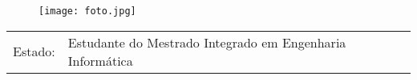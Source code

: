 \documentclass[10pt,a4paper]{article}
\newcommand{\tzlarrow}{(0,0) -- (0.2,0) -- (0.3,0.2) -- (0.2,0.4) -- (0,0.4) -- (0.1,0.2) -- cycle;}
\newcommand{\larrow}[1]
{\begin{tikzpicture}[scale=0.58]
	 \filldraw[fill=#1!100,draw=#1!100!black]  \tzlarrow
 \end{tikzpicture}
}
\newcommand{\metasection}[2]
{
\begin{tabular*}{1\textwidth}{p{2.4cm} p{11cm}}
\larrow{bgcol}	\normalsize{\textcolor{sectcol}{#1}}&#2\\[12pt]
\end{tabular*}
}
\begin{document}
\pagestyle{fancy}	


\vspace{-20.55pt}


\hspace{-0.25\linewidth}\colorbox{bgcol}{}



\begin{figure}[H]
\begin{flushright}
	\texttt{[image: foto.jpg]}
\end{flushright}
\end{figure}



\vspace{-114pt}

\metasection{Estado:}{Estudante do Mestrado Integrado em Engenharia Informática}
 
\end{document}
